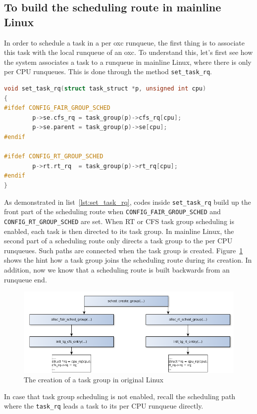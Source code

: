 \subsection{To build the scheduling route in mainline Linux}

In order to schedule a task in a per oxc runqueue, the first thing is to 
associate this task with the local runqueue of an oxc. To understand this,
let's first see how the system associates a task to a runqueue in mainline 
Linux, where there is only per CPU runqueues. This is done through
the method \texttt{set\_task\_rq}.

\begin{lstlisting}[language=C, label={lst:set_task_rq},
	caption={To associate tasks with a per CPU runqueue in mainline Linux}]
void set_task_rq(struct task_struct *p, unsigned int cpu)
{
#ifdef CONFIG_FAIR_GROUP_SCHED
        p->se.cfs_rq = task_group(p)->cfs_rq[cpu];
        p->se.parent = task_group(p)->se[cpu];
#endif

#ifdef CONFIG_RT_GROUP_SCHED
        p->rt.rt_rq  = task_group(p)->rt_rq[cpu];
#endif
}
\end{lstlisting}

As demonstrated in list~\ref{lst:set_task_rq}, codes inside 
\texttt{set\_task\_rq} build up the front part of the scheduling route 
when \texttt{CONFIG\_FAIR\_GROUP\_SCHED} and 
\texttt{CONFIG\_RT\_GROUP\_SCHED} are set.
When RT or CFS task group scheduling is enabled, each task is then directed 
to its task group. In mainline Linux, the second part of a scheduling route
only directs a task group to the per CPU runqueues. Such paths are connected 
when the task group is created. Figure~\ref{fig:tg_creation} shows the hint how 
a task group joins the scheduling route during its creation. In addition, now 
we know that a scheduling route is built backwards from an runqueue end.

\begin{figure}[htbp]
        \centering
        \includegraphics[width=\textwidth]{images/tg_creation}
        \caption{The creation of a task group in original Linux}
        \label{fig:tg_creation}
\end{figure}
In case that task group scheduling is not enabled, recall the scheduling path
where the \texttt{task\_rq} leads a task to its per CPU runqueue directly.

